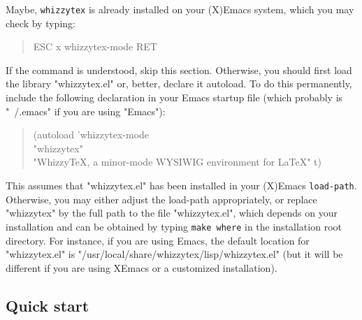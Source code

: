 \documentclass[12pt]{article}
\begin{document}
Maybe, {\tt whizzytex} is already installed on your (X)Emacs system, which
you may check by typing:
\begin{quote}
\begin{tt}
ESC x whizzytex-mode RET
\end{tt}
\end{quote}
If the command is understood, skip this section.
Otherwise, you should first load the library \lst"whizzytex.el" or, better,
declare it autoload. To do this permanently, include the following
declaration in your Emacs startup file (which probably is \lst"~/.emacs" if
you are using \lst"Emacs"):
\begin{quote}\small
\begin{tt}
(autoload 'whizzytex-mode \\ \indent\obeyspaces
    "whizzytex" \\ \indent\obeyspaces
    "WhizzyTeX, a minor-mode WYSIWIG environment for LaTeX" t)
\end{tt}
\end{quote}
This assumes that \lst"whizzytex.el" has been installed in your (X)Emacs
{\tt load-path}. Otherwise, you may either adjust the load-path
appropriately, or replace \lst"whizzytex" by the full path to the file
\lst"whizzytex.el", which depends on your installation and can be
obtained by typing {\tt make where} in the installation root directory.  For
instance, if you are using Emacs, the default location for
\lst"whizzytex.el" is
\lst"/usr/local/share/whizzytex/lisp/whizzytex.el" (but it will be different
if you are using XEmacs or a customized installation).


\subsection {Quick start}
\end{document}
